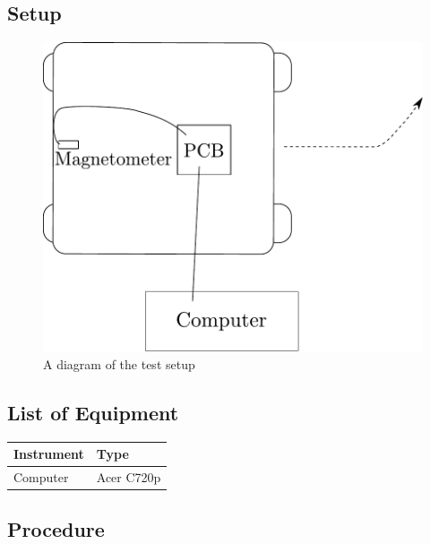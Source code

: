 \subsection{Setup}
\begin{figure}[H]
  \centering
	\includegraphics[scale=0.6]{figures/inertiaTestSetupDiagramTurning.pdf}
	\caption{A diagram of the test setup}
\end{figure}

\subsection{List of Equipment}

\begin{table}[H]
\begin{tabular}{|p{10cm}|p{4cm}|}
\hline%
  \textbf{Instrument}                     &  \textbf{Type}       \\
\hline%
  Computer                                &  Acer C720p    \\
\hline %
\end{tabular}
\end{table}

\subsection{Procedure}

